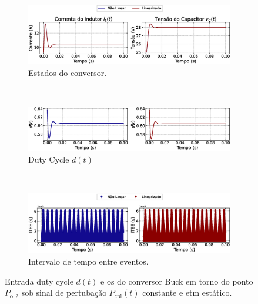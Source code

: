 \begin{figure}[H]
  \centering
  \captionsetup{justification=centering}
  \begin{subfigure}{1.\textwidth}
    \centering
    \includegraphics[width=1.\textwidth]{figuras/static-etm/buck/sim1/op2/result.eps}
    \caption{Estados do conversor.}
    \label{fig:buck_converter_constant_pcpl_static_etm_op2_duty_a}
  \end{subfigure}
  \\[6pt]
  \begin{subfigure}{1.\textwidth}
    \centering
    \includegraphics[width=1.\textwidth]{figuras/static-etm/buck/sim1/op2/duty-cycle.eps}
    \caption{Duty Cycle $d(t)$}
    \label{fig:buck_converter_constant_pcpl_static_etm_op2_duty_b}
  \end{subfigure}
  \\[6pt]
  \begin{subfigure}{1.\textwidth}
    \centering
    \includegraphics[width=1.\textwidth]{figuras/static-etm/buck/sim1/op2/inter-event-times.eps}
    \caption{Intervalo de tempo entre eventos.}
    \label{fig:buck_converter_constant_pcpl_static_etm_op2_duty_c}
  \end{subfigure}
  \caption{Entrada duty cycle $d(t)$ e os  do conversor Buck em torno do ponto $P_{\mathrm{o}, 2}$ sob sinal de pertubação $P_{\mathrm{cpl}}(t)$ constante e \acrshort{etm} estático.}
\end{figure}



